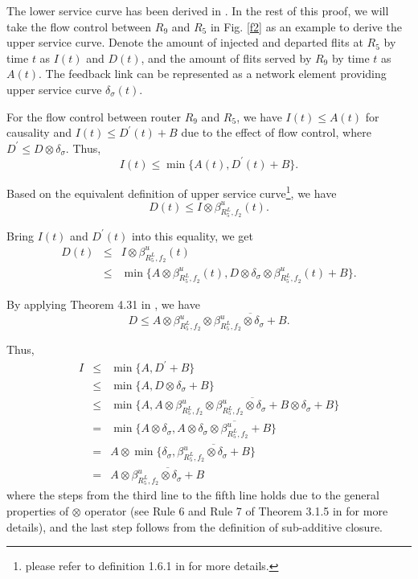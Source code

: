 \documentclass[10pt,journal]{IEEEtran}
\begin{document}
\begin{IEEEproof}
The lower service curve has been derived in \cite{qian2009analysis}. In the rest of this proof, we will take the flow control between $R_9$ and $R_5$ in Fig. \ref{f2} as an example to derive the upper service curve. Denote the amount of injected and departed flits at $R_5$ by time $t$ as $I(t)$ and $D(t)$, and the amount of flits served by $R_9$ by time $t$ as $A(t)$. The feedback link can be represented as a network element providing upper service curve $\delta_\sigma(t)$.

For the flow control between router $R_9$ and $R_5$, we have $I(t)\leq A(t)$ for causality and $I(t)\leq D^\prime(t)+B$ due to the effect of flow control, where $D^\prime\leq D\otimes\delta_\sigma$. Thus, $$I(t)\leq\min\{A(t),D^\prime(t)+B\}.$$

Based on the equivalent definition of upper service curve\footnote{please refer to definition 1.6.1 in \cite{Boudec2001Network} for more details.}, we have
$$D(t)\leq I\otimes \beta_{R_5^L,f_2}^u(t).$$

Bring $I(t)$ and $D^\prime(t)$ into this equality, we get
\begin{eqnarray*}
D(t)&\leq& I\otimes \beta_{R_5^L,f_2}^u(t)\\
&\leq& \min\{A\otimes \beta^u_{R_5^L,f_2}(t),D\otimes\delta_\sigma\otimes \beta_{R_5^L,f_2}^u(t)+B\}.
\end{eqnarray*}

By applying Theorem 4.31 in \cite{Boudec2001Network}, we have
$$D\leq A\otimes \beta^u_{R_5^L,f_2}\otimes\overline{\beta_{R_5^L,f_2}^u\otimes\delta_\sigma+B}.$$

Thus,
\begin{eqnarray*}
  I&\leq& \min\{A,D^\prime+B\}\\
  &\leq& \min\{A,D\otimes\delta_\sigma+B\}\\
  &\leq& \min\{A,A\otimes \beta_{R_5^L,f_2}^u\otimes\overline{\beta_{R_5^L,f_2}^u\otimes\delta_\sigma+B}\otimes\delta_\sigma+B\}\\
  &=& \min\{A\otimes \delta_\sigma,A\otimes \overline{\delta_\sigma\otimes\beta_{R_5^L,f_2}^u+B}\}\\
  &=& A\otimes\min\{\delta_\sigma,\overline{\beta_{R_5^L,f_2}^u\otimes\delta_\sigma+B}\}\\
  &=& A\otimes\overline{\beta_{R_5^L,f_2}^u\otimes\delta_\sigma+B}
\end{eqnarray*}
where the steps from the third line to the fifth line holds due to the general properties of $\otimes$ operator (see Rule 6 and Rule 7 of Theorem 3.1.5 in \cite{Boudec2001Network} for more details), and the last step follows from the definition of sub-additive closure.


\end{IEEEproof}
\end{document}
